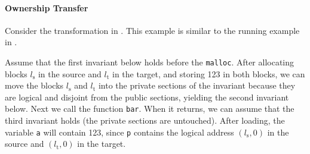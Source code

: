 \paragraph{Ownership Transfer}

Consider the transformation in .  This
example is similar to the running example in
.

Assume that the first invariant below holds before the \texttt{malloc}.  After
allocating blocks $l_\text{s}$ in the source and $l_\text{t}$ in
the target, and storing 123 in both blocks, we can move the blocks $l_\text{s}$
and $l_\text{t}$ into the private sections of the invariant because they are logical and disjoint from the
public sections, yielding the second invariant below. Next we call the function \texttt{bar}. When it
returns, we can assume that the third invariant holds (\ie the
private sections are untouched). After loading, the variable
\texttt{a} will contain 123, since \texttt{p} contains the
logical address $(l_\text{s},0)$ in the source and $(l_\text{t},0)$ in
the target. 

